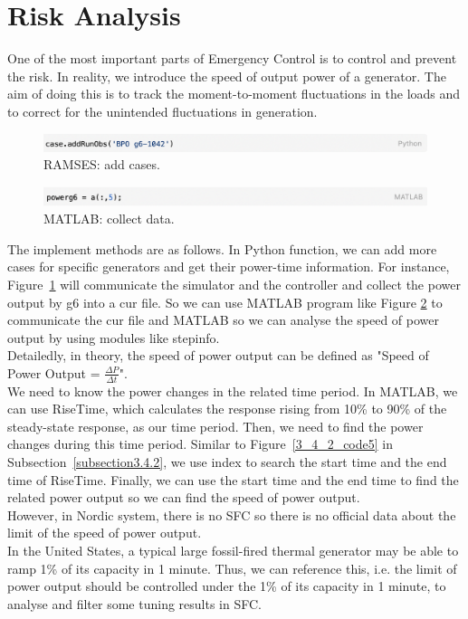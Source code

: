 \section{Risk Analysis} %
One of the most important parts of Emergency Control is to control and prevent the risk.  In reality, we introduce the speed of output power of a generator. The aim of doing this is to track the moment-to-moment fluctuations in the loads and to correct for the unintended fluctuations in generation.\\


\begin{figure}[htbp]
\centering
\includegraphics[width = .819\textwidth]{figure/6_5_code1.png}
\caption{RAMSES: add cases.}
\label{6_5_code1}
\end{figure}


\begin{figure}[htbp]
\centering
\includegraphics[width = .819\textwidth]{figure/6_5_code2.png}
\caption{MATLAB: collect data.}
\label{6_5_code2}
\end{figure}

The implement methods are as follows. In Python function, we can add more cases for specific generators and get their power-time information. For instance, Figure~\ref{6_5_code1} will communicate the simulator and the controller and collect the power output by g6 into a cur file. So we can use MATLAB program like Figure \textcolor{red}{\ref{6_5_code2}} to communicate the cur file and MATLAB so we can analyse the speed of power output by using modules like stepinfo.\\


Detailedly, in theory, the speed of power output can be defined as "Speed of Power Output = $\frac{\Delta P}{\Delta t}$".\\

We need to know the power changes in the related time period. In MATLAB, we can use RiseTime, which calculates the response rising from 10\% to 90\% of the steady-state response, as our time period. Then, we need to find the power changes during this time period. Similar to Figure~\ref{3_4_2_code5} in Subsection~\ref{subsection3.4.2}, we use index to search the start time and the end time of RiseTime. Finally,  we can use the start time and the end time to find the related power output so we can find the speed of power output.\\


However, in Nordic system, there is no SFC so there is no official data about the limit of the speed of power output. \\

In the United States, a typical large fossil-fired thermal generator may be able to ramp 1\% of its capacity in 1 minute. Thus, we can reference this, i.e. the limit of power output should be controlled under the 1\% of its capacity in 1 minute, to analyse and filter some tuning results in SFC.\\